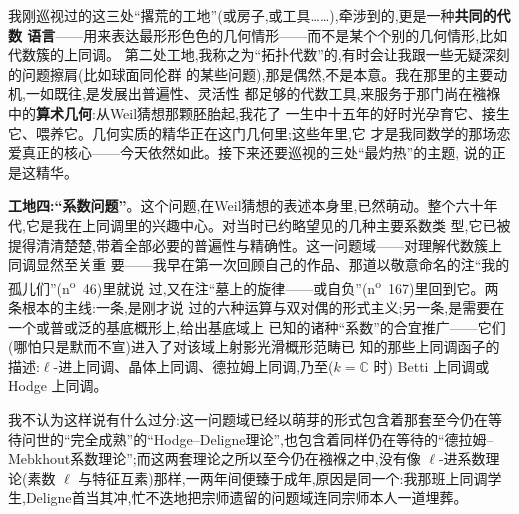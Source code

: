 我刚巡视过的这三处“撂荒的工地”(或房子,或工具……),牵涉到的,更是一种\textbf{共同的代数
语言}——用来表达最形形色色的几何情形——而不是某个个别的几何情形,比如代数簇的上同调。
第二处工地,我称之为“拓扑代数”的,有时会让我跟一些无疑深刻的问题擦肩(比如球面同伦群
的某些问题),那是偶然,不是本意。我在那里的主要动机,一如既往,是发展出普遍性、灵活性
都足够的代数工具,来服务于那门尚在襁褓中的\textbf{算术几何}:从Weil猜想那颗胚胎起,我花了
一生中十五年的好时光孕育它、接生它、喂养它。几何实质的精华正在这门几何里;这些年里,它
才是我同数学的那场恋爱真正的核心——今天依然如此。接下来还要巡视的三处“最灼热”的主题,
说的正是这精华。

\textbf{工地四:“系数问题”}。这个问题,在Weil猜想的表述本身里,已然萌动。整个六十年代,它是我在上同调里的兴趣中心。对当时已约略望见的几种主要系数类
型,它已被提得清清楚楚,带着全部必要的普遍性与精确性。这一问题域——对理解代数簇上同调显然至关重
要\dmark{}——我早在第一次回顾自己的作品、那道以敬意命名的注“我的孤儿们”(n\textsuperscript{o}~46)里就说
过,又在注“墓上的旋律——或自负”(n\textsuperscript{o}~167)里回到它。两条根本的主线:一条,是刚才说
过的六种运算与双对偶的形式主义;另一条,是需要在一个或普或泛的基底概形上,给出基底域上
已知的诸种“系数”的合宜推广——它们(哪怕只是默而不宣)进入了对该域上射影光滑概形范畴已
知的那些上同调函子的描述:$\ell$-进上同调、晶体上同调、德拉姆上同调,乃至($k=\mathbb{C}$ 时)
Betti 上同调或 Hodge 上同调。

我不认为这样说有什么过分:这一问题域已经以萌芽的形式包含着那套至今仍在等待问世的“完全成熟”的“Hodge--Deligne理论”,也包含着同样仍在等待的“德拉姆--Mebkhout系数理论”;而这两套理论之所以至今仍在襁褓之中,没有像 $\ell$-进系数理论(素数 $\ell$ 与特征互素)那样,一两年间便臻于成年,原因是同一个:我那班上同调学生,Deligne首当其冲,忙不迭地把宗师遗留的问题域连同宗师本人一道埋葬。


